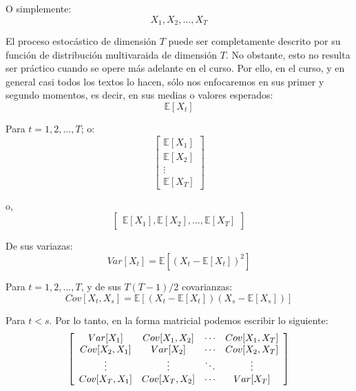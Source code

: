 \documentclass[
]{book}
\begin{document}
O simplemente:
\begin{equation}
    X_1, X_2, \ldots, X_T
    \label{eq:Serie3}
\end{equation}

El proceso estocástico de dimensión \(T\) puede ser completamente descrito por su función de distribución multivaraida de dimensión \(T\). No obstante, esto no resulta ser práctico cuando se opere más adelante en el curso. Por ello, en el curso, y en general casi todos los textos lo hacen, sólo nos enfocaremos en sus primer y segundo momentos, es decir, en sus medias o valores esperados:
\begin{equation*}
    \mathbb{E}[X_t]
\end{equation*}

Para \(t = 1, 2, \ldots, T\); o:
\begin{equation*}
\left[
    \begin{array}{c}
    \mathbb{E}[X_1] \\
    \mathbb{E}[X_2] \\
    \vdots \\
    \mathbb{E}[X_T]
    \end{array}
\right]
\end{equation*}

o,
\begin{equation*}
\left[
    \begin{array}{c}
    \mathbb{E}[X_1], \mathbb{E}[X_2], \ldots, \mathbb{E}[X_T]
    \end{array}
\right]
\end{equation*}

De sus variazas:
\begin{equation*}
    Var[X_t] = \mathbb{E}[(X_t - \mathbb{E}[X_t])^2]
\end{equation*}

Para \(t = 1, 2, \ldots, T\), y de sus \(T(T-1)/2\) covarianzas:
\begin{equation*}
    Cov[X_t,X_s] = \mathbb{E}[(X_t - \mathbb{E}[X_t])(X_s - \mathbb{E}[X_s])]
\end{equation*}

Para \(t < s\). Por lo tanto, en la forma matricial podemos escribir lo siguiente:
\begin{equation*}
\left[
    \begin{array}{c c c c}
    Var[X_1] & Cov[X_1,X_2] & \cdots & Cov[X_1,X_T] \\
    Cov[X_2,X_1] & Var[X_2] & \cdots & Cov[X_2,X_T] \\
    \vdots & \vdots & \ddots & \vdots \\
    Cov[X_T,X_1] & Cov[X_T,X_2] & \cdots & Var[X_T] \\
    \end{array}
\right]
\end{equation*}
\end{document}
